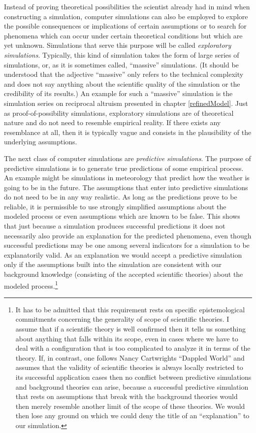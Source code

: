 Instead of proving theoretical possibilities the scientist already had in mind
when constructing a simulation, computer simulations can also be employed to
explore the possible consequences or implications of certain assumptions or to
search for phenomena which can occur under certain theoretical conditions but
which are yet unknown. Simulations that serve this purpose will be called {\em
  exploratory simulations}. Typically, this kind of simulation takes the form
of large series of simulations, or, as it is sometimes called, ``massive''
simulations. (It should be understood that the adjective ``massive'' only
refers to the technical complexity and does not say anything about the
scientific quality of the simulation or the credibility of its results.) An
example for such a ``massive'' simulation is the simulation series on
reciprocal altruism presented in chapter \ref{refinedModel}. Just as
proof-of-possibility simulations, exploratory simulations are of theoretical
nature and do not need to resemble empirical reality. If there exists any
resemblance at all, then it is typically vague and consists in the
plausibility of the underlying assumptions.

The next class of computer simulations are {\em predictive simulations}. The
purpose of predictive simulations is to generate true predictions of some
empirical process. An example might be simulations in meteorology that predict
how the weather is going to be in the future. The assumptions that enter into
predictive simulations do not need to be in any way realistic. As long as the
predictions prove to be reliable, it is permissible to use strongly simplified
assumptions about the modeled process or even assumptions which are known to
be false. This shows that just because a simulation produces successful
predictions it does not necessarily also provide an explanation for the
predicted phenomena, even though successful predictions may be one among
several indicators for a simulation to be explanatorily valid. As an
explanation we would accept a predictive simulation only if the assumptions
built into the simulation are consistent with our background knowledge
(consisting of the accepted scientific theories) about the modeled
process.\footnote{It has to be admitted that this requirement rests on
  specific epistemological commitments concerning the generality of scope of
  scientific theories. I assume that if a scientific theory is well confirmed
  then it tells us something about anything that falls within its scope, even
  in cases where we have to deal with a configuration that is too complicated
  to analyze it in terms of the theory. If, in contrast, one follows Nancy
  Cartwrights ``Dappled World'' \cite[]{cartwright:1999} and assumes that the
  validity of scientific theories is always locally restricted to its
  successful application cases then no conflict between predictive simulations
  and background theories can arise, because a successful predictive
  simulation that rests on assumptions that break with the background theories
  would then merely resemble another limit of the scope of these theories. We
  would then lose any ground on which we could deny the title of an
  ``explanation'' to our simulation.}

